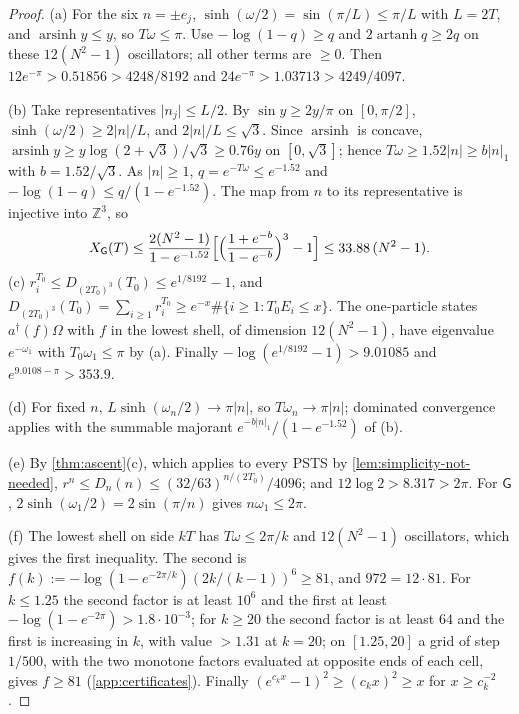 \documentclass[11pt,a4paper]{amsart}
\theoremstyle{definition}
\theoremstyle{remark}
\numberwithin{equation}{section}
\newcommand{\Z}{\mathbb{Z}}          %
\newcommand{\abs}[1]{\lvert #1\rvert}      %
\newcommand{\PSTS}{\textup{PSTS}}          %
\newcommand{\TT}{\mathbb{T}}               %
\newcommand{\Zc}{\mathcal{Z}}              %
\newcommand{\Dexc}[2]{D_{#1}(#2)}          %
\newcommand{\cube}[1]{(2#1)^3}             %
\newcommand{\Gharm}{\mathsf{G}}            %
\begin{document}
\begin{proof}
(a) For the six $n=\pm e_j$, $\sinh(\omega/2)=\sin(\pi/L)\le\pi/L$ with $L=2T$, and $\operatorname{arsinh}y\le y$, so $T\omega\le\pi$. Use $-\log(1-q)\ge q$ and $2\operatorname{artanh}q\ge2q$ on these $12(N^2-1)$ oscillators; all other terms are $\ge0$. Then $12e^{-\pi}>0.51856>4248/8192$ and $24e^{-\pi}>1.03713>4249/4097$.

(b) Take representatives $\abs{n_j}\le L/2$. By $\sin y\ge2y/\pi$ on $[0,\pi/2]$, $\sinh(\omega/2)\ge2\abs n/L$, and $2\abs n/L\le\sqrt3$. Since $\operatorname{arsinh}$ is concave, $\operatorname{arsinh}y\ge y\log(2+\sqrt3)/\sqrt3\ge0.76y$ on $[0,\sqrt3]$; hence $T\omega\ge1.52\abs n\ge b\abs n_1$ with $b=1.52/\sqrt3$. As $\abs n\ge1$, $q=e^{-T\omega}\le e^{-1.52}$ and $-\log(1-q)\le q/(1-e^{-1.52})$. The map from $n$ to its representative is injective into $\Z^3$, so
\[
X_\Gharm(T)\le\frac{2(N^2-1)}{1-e^{-1.52}}\Bigl[\Bigl(\frac{1+e^{-b}}{1-e^{-b}}\Bigr)^3-1\Bigr]\le33.88\,(N^2-1).
\]
(c) $r_i^{T_0}\le\Dexc{\cube{T_0}}{T_0}\le e^{1/8192}-1$, and $\Dexc{\cube{T_0}}{T_0}=\sum_{i\ge1}r_i^{T_0}\ge e^{-x}\#\{i\ge1:T_0E_i\le x\}$. The one-particle states $a^\dagger(f)\Omega$ with $f$ in the lowest shell, of dimension $12(N^2-1)$, have eigenvalue $e^{-\omega_1}$ with $T_0\omega_1\le\pi$ by (a). Finally $-\log(e^{1/8192}-1)>9.01085$ and $e^{9.0108-\pi}>353.9$.

(d) For fixed $n$, $L\sinh(\omega_n/2)\to\pi\abs n$, so $T\omega_n\to\pi\abs n$; dominated convergence applies with the summable majorant $e^{-b\abs n_1}/(1-e^{-1.52})$ of (b).

(e) By \cref{thm:ascent}(c), which applies to every \PSTS{} by \cref{lem:simplicity-not-needed}, $r^n\le\Dexc{n}{n}\le(32/63)^{n/(2T_0)}/4096$; and $12\log2>8.317>2\pi$. For $\Gharm$, $2\sinh(\omega_1/2)=2\sin(\pi/n)$ gives $n\omega_1\le2\pi$.

(f) The lowest shell on side $kT$ has $T\omega\le2\pi/k$ and $12(N^2-1)$ oscillators, which gives the first inequality. The second is $f(k):=-\log(1-e^{-2\pi/k})(2k/(k-1))^6\ge81$, and $972=12\cdot81$. For $k\le1.25$ the second factor is at least $10^6$ and the first at least $-\log(1-e^{-2\pi})>1.8\cdot10^{-3}$; for $k\ge20$ the second factor is at least $64$ and the first is increasing in $k$, with value $>1.31$ at $k=20$; on $[1.25,20]$ a grid of step $1/500$, with the two monotone factors evaluated at opposite ends of each cell, gives $f\ge81$ (\cref{app:certificates}). Finally $(e^{c_kx}-1)^2\ge(c_kx)^2\ge x$ for $x\ge c_k^{-2}$.
\end{proof}
\end{document}
